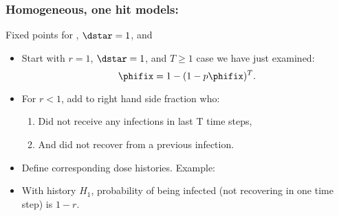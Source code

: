 \begin{frame}
  \frametitle{Homogeneous, one hit models:}

  \begin{block}{Fixed points for , $\dstar=1$, and }
    \begin{itemize}
    \item<1-> 
      Start with $r=1$, $\dstar=1$, and $T \ge 1$ case we have
      just examined:
      $$
      \phifix = 1 - (1 - p\phifix)^T.
      $$
    \item<2-> 
      For $r<1$, add to right hand side fraction who:
      \begin{enumerate}
      \item<3->
        Did not receive any infections in last T time steps,
      \item<4->
        And \alert{did not recover} from a previous infection.
      \end{enumerate}
    \item<5->
      Define corresponding dose histories.  Example:
    \item<7->
      With history $H_1$, probability of being infected
      (not recovering in one time step) is $1-r$.
    \end{itemize}
  \end{block}
 
\end{frame}

